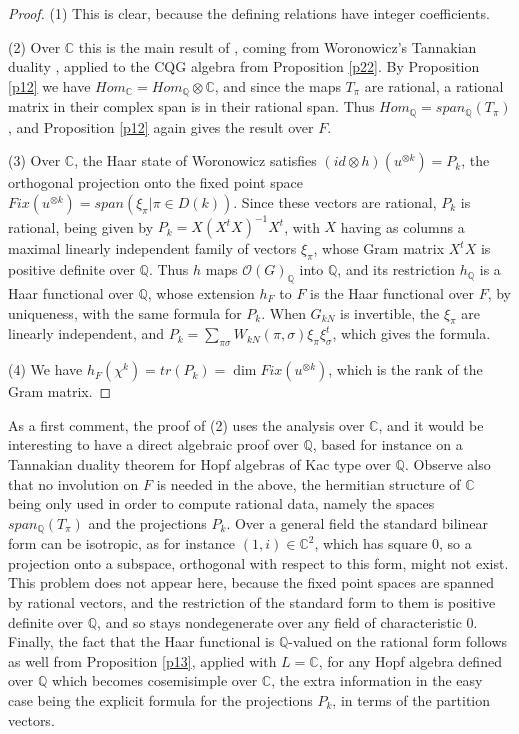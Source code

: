 \documentclass[11pt]{amsart}
\theoremstyle{definition}
\begin{document}
\begin{proof}
(1) This is clear, because the defining relations have integer coefficients.

(2) Over $\mathbb C$ this is the main result of \cite{bsp}, coming from Woronowicz's Tannakian duality \cite{wo2}, applied to the CQG algebra from Proposition \ref{p22}. By Proposition \ref{p12} we have $Hom_{\mathbb C}=Hom_{\mathbb Q}\otimes\mathbb C$, and since the maps $T_\pi$ are rational, a rational matrix in their complex span is in their rational span. Thus $Hom_{\mathbb Q}=span_{\mathbb Q}(T_\pi)$, and Proposition \ref{p12} again gives the result over $F$.

(3) Over $\mathbb C$, the Haar state of Woronowicz satisfies $(id\otimes h)(u^{\otimes k})=P_k$, the orthogonal projection onto the fixed point space $Fix(u^{\otimes k})=span(\xi_\pi|\pi\in D(k))$. Since these vectors are rational, $P_k$ is rational, being given by $P_k=X(X^tX)^{-1}X^t$, with $X$ having as columns a maximal linearly independent family of vectors $\xi_\pi$, whose Gram matrix $X^tX$ is positive definite over $\mathbb Q$. Thus $h$ maps $\mathcal O(G)_{\mathbb Q}$ into $\mathbb Q$, and its restriction $h_{\mathbb Q}$ is a Haar functional over $\mathbb Q$, whose extension $h_F$ to $F$ is the Haar functional over $F$, by uniqueness, with the same formula for $P_k$. When $G_{kN}$ is invertible, the $\xi_\pi$ are linearly independent, and $P_k=\sum_{\pi\sigma}W_{kN}(\pi,\sigma)\xi_\pi\xi_\sigma^t$, which gives the formula.

(4) We have $h_F(\chi^k)=tr(P_k)=\dim Fix(u^{\otimes k})$, which is the rank of the Gram matrix.
\end{proof}

As a first comment, the proof of (2) uses the analysis over $\mathbb C$, and it would be interesting to have a direct algebraic proof over $\mathbb Q$, based for instance on a Tannakian duality theorem for Hopf algebras of Kac type over $\mathbb Q$. Observe also that no involution on $F$ is needed in the above, the hermitian structure of $\mathbb C$ being only used in order to compute rational data, namely the spaces $span_{\mathbb Q}(T_\pi)$ and the projections $P_k$. Over a general field the standard bilinear form can be isotropic, as for instance $(1,i)\in\mathbb C^2$, which has square $0$, so a projection onto a subspace, orthogonal with respect to this form, might not exist. This problem does not appear here, because the fixed point spaces are spanned by rational vectors, and the restriction of the standard form to them is positive definite over $\mathbb Q$, and so stays nondegenerate over any field of characteristic $0$. Finally, the fact that the Haar functional is $\mathbb Q$-valued on the rational form follows as well from Proposition \ref{p13}, applied with $L=\mathbb C$, for any Hopf algebra defined over $\mathbb Q$ which becomes cosemisimple over $\mathbb C$, the extra information in the easy case being the explicit formula for the projections $P_k$, in terms of the partition vectors.
\end{document}
